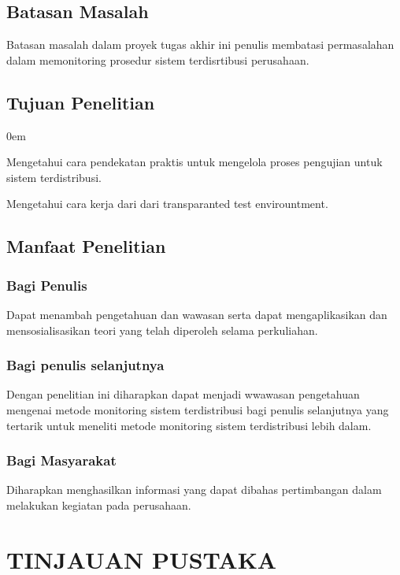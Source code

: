 \documentclass{jtetiproposalskripsi}
\begin{document}
\section{Batasan Masalah}
Batasan masalah dalam proyek tugas akhir ini penulis membatasi permasalahan dalam memonitoring prosedur  sistem terdisrtibusi perusahaan.

\section{Tujuan Penelitian}
\begin{enumerate}[a.]
\begin{singlespace}
\itemsep0em
\item Mengetahui cara pendekatan praktis untuk mengelola proses pengujian untuk  sistem terdistribusi.
\item Mengetahui cara kerja dari dari transparanted test envirountment.
\end{singlespace}
\end{enumerate}

\section{Manfaat Penelitian}
\subsection{Bagi Penulis}
Dapat menambah pengetahuan dan wawasan serta dapat mengaplikasikan dan mensosialisasikan teori yang telah diperoleh selama perkuliahan.

\subsection{Bagi penulis selanjutnya}
Dengan penelitian ini diharapkan dapat menjadi wwawasan pengetahuan mengenai metode monitoring sistem terdistribusi bagi penulis selanjutnya yang tertarik untuk meneliti metode monitoring sistem terdistribusi lebih dalam.

\subsection{Bagi Masyarakat}
Diharapkan menghasilkan informasi yang dapat dibahas pertimbangan dalam melakukan kegiatan pada perusahaan.


\chapter{TINJAUAN PUSTAKA}                
\end{document}
